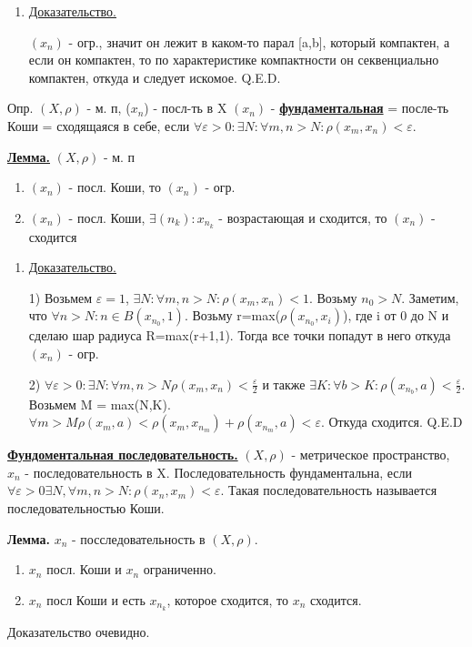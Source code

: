 \documentclass{article}
\newcommand{\deff}[1]{\underline{\textbf{#1}}}
\newcommand{\thmm}[1]{\underline{\textbf{#1}}}
\begin{document}
\begin{enumerate}
        \item[] \uline{Доказательство.}
        
       $(x_n)$ - огр., значит он лежит в каком-то парал [a,b], который компактен, а если он компактен, то по характеристике компактности он секвенциально компактен, откуда и следует искомое. Q.E.D.
\end{enumerate}

Опр. $(X, \rho)$  - м. п, ($x_n$) - посл-ть в X
$(x_n)$ - \deff{фундаментальная} = после-ть Коши = сходящаяся в себе, если
$\forall \varepsilon > 0: \exists N: \forall m,n>N: \rho(x_m,x_n)<\varepsilon$.

\thmm{Лемма.} $(X, \rho)$  - м. п
\begin{enumerate}
    \item $(x_n)$ - посл. Коши, то $(x_n)$ - огр.
    \item $(x_n)$ - посл. Коши, $\exists(n_k): x_{n_k}$ - возрастающая и сходится, то $(x_n)$ - сходится
\end{enumerate}

\begin{enumerate}
        \item[] \uline{Доказательство.}
        
        1) Возьмем $\varepsilon = 1$, $ \exists N: \forall m,n>N: \rho(x_m,x_n)<1$. Возьму $n_0>N$. Заметим, что $\forall n>N: n \in B(x_{n_0},1)$. Возьму r=max($\rho(x_{n_0},x_i)$), где i от 0 до N и сделаю шар радиуса R=max(r+1,1). Тогда все точки попадут в него откуда $(x_n)$ - огр.

        2) $\forall \varepsilon>0: \exists N: \forall m,n>N \rho(x_m,x_n)<\frac{\varepsilon}{2}$ 
        и также $\exists K:\forall b>K:\rho(x_{n_b},a)<\frac{\varepsilon}{2}$.  Возьмем M = max(N,K). $\forall m > M\rho(x_m,a)<\rho(x_m,x_{n_m})+\rho(x_{n_m},a)<\varepsilon$. Откуда сходится. Q.E.D
\end{enumerate}

\deff{Фундоментальная последовательность.} $(X,\rho)$ - метрическое пространство, $x_n$ - последовательность в X. Последовательность фундаментальна, если $\forall \varepsilon >0 \exists N, \forall m,n > N: \rho(x_n,x_m)<\varepsilon$. Такая последовательность  называется последовательностью Коши.

\textbf{Лемма.}  ${x_n}$ -  посследовательность в $(X,\rho)$.

\begin{enumerate}
    \item $x_n$ посл. Коши и $x_n$ ограниченно.
    \item $x_n$ посл Коши и есть $x_{n_k}$, которое сходится,  то $x_n$ сходится.
\end{enumerate}
Доказательство очевидно.
\end{document}
